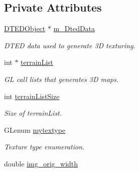 \subsection*{Private Attributes}
\begin{DoxyCompactItemize}
\item 
\hypertarget{class_geomap3_d_a40a24e412d6c67aed45b2372e200ae64}{
\hyperlink{class_d_t_e_d_object}{DTEDObject} $\ast$ \hyperlink{class_geomap3_d_a40a24e412d6c67aed45b2372e200ae64}{m\_\-DtedData}}
\label{class_geomap3_d_a40a24e412d6c67aed45b2372e200ae64}

\begin{DoxyCompactList}\small\item\em DTED data used to generate 3D texturing. \end{DoxyCompactList}\item 
\hypertarget{class_geomap3_d_a1870cd15a9a0fb293aba66f247ec46c8}{
int $\ast$ \hyperlink{class_geomap3_d_a1870cd15a9a0fb293aba66f247ec46c8}{terrainList}}
\label{class_geomap3_d_a1870cd15a9a0fb293aba66f247ec46c8}

\begin{DoxyCompactList}\small\item\em GL call lists that generates 3D maps. \end{DoxyCompactList}\item 
\hypertarget{class_geomap3_d_a3cb512f5d05db284ad6a1fae6f558ec2}{
int \hyperlink{class_geomap3_d_a3cb512f5d05db284ad6a1fae6f558ec2}{terrainListSize}}
\label{class_geomap3_d_a3cb512f5d05db284ad6a1fae6f558ec2}

\begin{DoxyCompactList}\small\item\em Size of terrainList. \end{DoxyCompactList}\item 
\hypertarget{class_geomap3_d_ad8e5594579a9081091b84f9f21187f56}{
GLenum \hyperlink{class_geomap3_d_ad8e5594579a9081091b84f9f21187f56}{mytextype}}
\label{class_geomap3_d_ad8e5594579a9081091b84f9f21187f56}

\begin{DoxyCompactList}\small\item\em Texture type enumeration. \end{DoxyCompactList}\item 
\hypertarget{class_geomap3_d_a4f468efd7573e75d7440885d94d02346}{
double \hyperlink{class_geomap3_d_a4f468efd7573e75d7440885d94d02346}{img\_\-orig\_\-width}}
\label{class_geomap3_d_a4f468efd7573e75d7440885d94d02346}


\end{DoxyCompactItemize}

